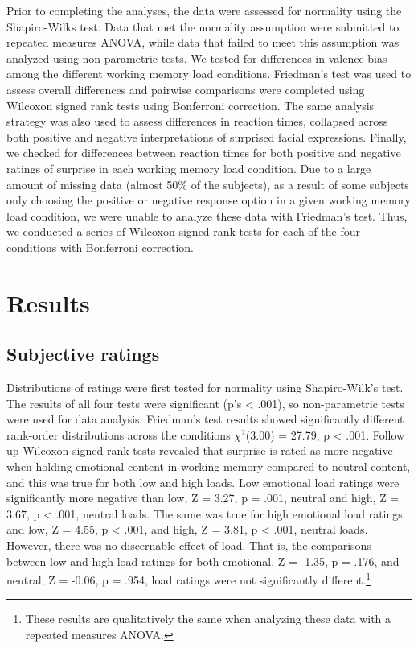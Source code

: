\documentclass[man]{apa6}
\let\rmarkdownfootnote\footnote%
\def\footnote{\protect\rmarkdownfootnote}
\begin{document}
Prior to completing the analyses, the data were assessed for normality using the Shapiro-Wilks test. Data that met the normality assumption were submitted to repeated measures ANOVA, while data that failed to meet this assumption was analyzed using non-parametric tests. We tested for differences in valence bias among the different working memory load conditions. Friedman's test was used to assess overall differences and pairwise comparisons were completed using Wilcoxon signed rank tests using Bonferroni correction. The same analysis strategy was also used to assess differences in reaction times, collapsed across both positive and negative interpretations of surprised facial expressions. Finally, we checked for differences between reaction times for both positive and negative ratings of surprise in each working memory load condition. Due to a large amount of missing data (almost 50\% of the subjects), as a result of some subjects only choosing the positive or negative response option in a given working memory load condition, we were unable to analyze these data with Friedman's test. Thus, we conducted a series of Wilcoxon signed rank tests for each of the four conditions with Bonferroni correction.

\hypertarget{results}{%
\section{Results}\label{results}}

\hypertarget{subjective-ratings}{%
\subsection{Subjective ratings}\label{subjective-ratings}}

Distributions of ratings were first tested for normality using Shapiro-Wilk's test. The results of all four tests were significant (p's \textless{} .001), so non-parametric tests were used for data analysis. Friedman's test results showed significantly different rank-order distributions across the conditions \(\chi^{2}\)(3.00) = 27.79, p \textless{} .001. Follow up Wilcoxon signed rank tests revealed that surprise is rated as more negative when holding emotional content in working memory compared to neutral content, and this was true for both low and high loads. Low emotional load ratings were significantly more negative than low, Z = 3.27, p = .001, neutral and high, Z = 3.67, p \textless{} .001, neutral loads. The same was true for high emotional load ratings and low, Z = 4.55, p \textless{} .001, and high, Z = 3.81, p \textless{} .001, neutral loads. However, there was no discernable effect of load. That is, the comparisons between low and high load ratings for both emotional, Z = -1.35, p = .176, and neutral, Z = -0.06, p = .954, load ratings were not significantly different.\footnote{These results are qualitatively the same when analyzing these data with a repeated measures ANOVA.}
\end{document}
